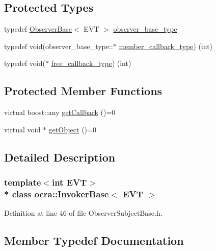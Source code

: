 \subsection*{Protected Types}
\begin{DoxyCompactItemize}
\item 
typedef \hyperlink{classocra_1_1ObserverBase}{Observer\+Base}$<$ E\+VT $>$ \hyperlink{classocra_1_1InvokerBase_a186d1d95173d5875d4cdf113312d3b12}{observer\+\_\+base\+\_\+type}
\item 
typedef void(observer\+\_\+base\+\_\+type\+::$\ast$ \hyperlink{classocra_1_1InvokerBase_ab20a012fb61b3ffde70547b1f696f3bc}{member\+\_\+callback\+\_\+type}) (int)
\item 
typedef void($\ast$ \hyperlink{classocra_1_1InvokerBase_a19d9d2e44df4df24b203e918ead8d01e}{free\+\_\+callback\+\_\+type}) (int)
\end{DoxyCompactItemize}
\subsection*{Protected Member Functions}
\begin{DoxyCompactItemize}
\item 
virtual boost\+::any \hyperlink{classocra_1_1InvokerBase_aab9488dbb26120ccfa7c77be11c01ba9}{get\+Callback} ()=0
\item 
virtual void $\ast$ \hyperlink{classocra_1_1InvokerBase_a90d81926209cb3119933412f742bc245}{get\+Object} ()=0
\end{DoxyCompactItemize}


\subsection{Detailed Description}
\subsubsection*{template$<$int E\+VT$>$\\*
class ocra\+::\+Invoker\+Base$<$ E\+V\+T $>$}



Definition at line 46 of file Observer\+Subject\+Base.\+h.



\subsection{Member Typedef Documentation}

